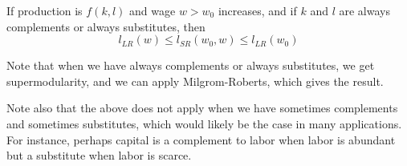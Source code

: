 \begin{prop}
  If production is $f(k,l)$ and wage $w > w_0$ increases, and if $k$
  and $l$ are always complements or always substitutes, then
  \[
  l_{LR}(w) \leq l_{SR}(w_0, w) \leq l_{LR}(w_0)
  \]
\end{prop}

Note that when we have always complements or always substitutes, we
get supermodularity, and we can apply Milgrom-Roberts, which gives the
result.

Note also that the above does not apply when we have sometimes complements
and sometimes substitutes, which would likely be the case in many
applications. For instance, perhaps capital is a complement to labor
when labor is abundant but a substitute when labor is scarce.
